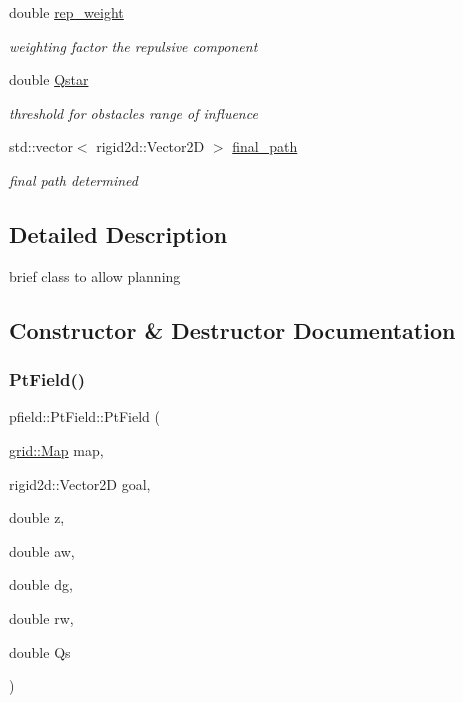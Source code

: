 \begin{DoxyCompactItemize}
\mbox{\label{classpfield_1_1PtField_acc129742194272617f51b200c49dcd52}} 
double \hyperlink{classpfield_1_1PtField_acc129742194272617f51b200c49dcd52}{rep\+\_\+weight}
\begin{DoxyCompactList}\small\item\em weighting factor the repulsive component \end{DoxyCompactList}\item 
\mbox{\label{classpfield_1_1PtField_a1223f43ad697e3539a732b08b5d77926}} 
double \hyperlink{classpfield_1_1PtField_a1223f43ad697e3539a732b08b5d77926}{Qstar}
\begin{DoxyCompactList}\small\item\em threshold for obstacles range of influence \end{DoxyCompactList}\item 
\mbox{\label{classpfield_1_1PtField_a941337f34ead9c01f53427075be8a0b9}} 
std\+::vector$<$ rigid2d\+::\+Vector2D $>$ \hyperlink{classpfield_1_1PtField_a941337f34ead9c01f53427075be8a0b9}{final\+\_\+path}
\begin{DoxyCompactList}\small\item\em final path determined \end{DoxyCompactList}\end{DoxyCompactItemize}


\subsection{Detailed Description}
brief class to allow planning 

\subsection{Constructor \& Destructor Documentation}
\mbox{\label{classpfield_1_1PtField_aee7dcc713ac6d16364e8bebe2da64681}} 
\subsubsection{\texorpdfstring{Pt\+Field()}{PtField()}}
{\footnotesize\ttfamily pfield\+::\+Pt\+Field\+::\+Pt\+Field (\begin{DoxyParamCaption}\item[{\hyperlink{structgrid_1_1Map}{grid\+::\+Map}}]{map,  }\item[{rigid2d\+::\+Vector2D}]{goal,  }\item[{double}]{z,  }\item[{double}]{aw,  }\item[{double}]{dg,  }\item[{double}]{rw,  }\item[{double}]{Qs }\end{DoxyParamCaption})}



